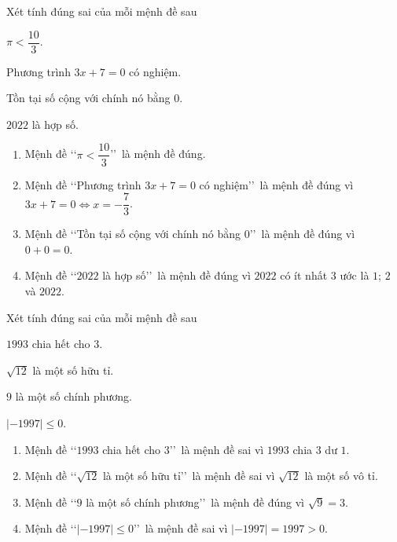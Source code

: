 \begin{bt}%
	Xét tính đúng sai của mỗi mệnh đề sau
	\begin{listEX}[2]
		\item $\pi<\dfrac{10}{3}$.
		\item Phương trình $3x+7=0$ có nghiệm.
		\item Tồn tại số cộng với chính nó bằng $0$.
		\item $2022$ là hợp số.
	\end{listEX}
	\loigiai
	{
		\begin{enumerate}
			\item Mệnh đề \lq\lq $\pi<\dfrac{10}{3}$\rq\rq\ là mệnh đề đúng.
			\item Mệnh đề \lq\lq Phương trình $3x+7=0$ có nghiệm\rq\rq\ là mệnh đề đúng vì $3x+7=0 \Leftrightarrow x=-\dfrac{7}{3}$.
			\item Mệnh đề \lq\lq Tồn tại số cộng với chính nó bằng $0$\rq\rq\ là mệnh đề đúng vì $0+0=0$.
			\item Mệnh đề \lq\lq $2022$ là hợp số\rq\rq\ là mệnh đề đúng vì $2022$ có ít nhất $3$ ước là $1$; $2$ và $2022$.
		\end{enumerate}
	}
\end{bt}

\begin{bt}%
	Xét tính đúng sai của mỗi mệnh đề sau
	\begin{listEX}[2]
		\item $1993$ chia hết cho $3$.
		\item $\sqrt{12}$ là một số hữu tỉ.
		\item $9$ là một số chính phương.
		\item $|-1997|\leqslant0$.
	\end{listEX}
	\loigiai
	{
		\begin{enumerate}
			\item Mệnh đề \lq\lq $1993$ chia hết cho $3$\rq\rq\ là mệnh đề sai vì $1993$ chia $3$ dư $1$.
			\item Mệnh đề \lq\lq $\sqrt{12}$ là một số hữu tỉ\rq\rq\ là mệnh đề sai vì $\sqrt{12}$ là một số vô tỉ.
			\item Mệnh đề \lq\lq $9$ là một số chính phương\rq\rq\ là mệnh đề đúng vì $\sqrt{9}=3$.
			\item Mệnh đề \lq\lq $|-1997|\leqslant0$\rq\rq\ là mệnh đề sai vì $|-1997|=1997>0$.
		\end{enumerate}
	}
\end{bt}


